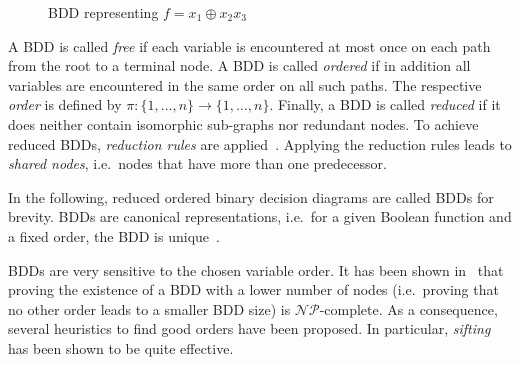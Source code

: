 \documentclass[10pt,letterpaper,twoside,openright]{book}
\begin{document}
\begin{figure}
\centering
{}
\caption{BDD representing $f=x_1 \oplus x_2x_3$}
\label{example:bdd}  
\end{figure}

A BDD is called \emph{free} if each variable is encountered at
most once on each path from the root to a terminal node. 
A BDD is called \emph{ordered} if in addition all
variables are encountered in the same order on all such paths. 
The respective \emph{order} is defined by
$\pi : \lbrace 1,\dots ,n\rbrace \rightarrow \lbrace 1,\dots ,n\rbrace $.
Finally, a BDD is called \emph{reduced} if it does neither contain isomorphic sub-graphs nor
redundant nodes. To achieve reduced BDDs, \emph{reduction rules} are applied~\cite{Bryant1986}.
Applying the reduction rules leads to \emph{shared nodes}, i.e.~nodes
that have more than one predecessor.

In the following, reduced ordered binary decision diagrams are called BDDs
for brevity. BDDs are canonical representations, i.e.~for a given Boolean function
and a fixed order, the BDD is unique~\cite{Bryant1986}. 


BDDs are very sensitive to the chosen variable order. It has been shown
in~\cite{BW:96} that proving the existence of a BDD with a lower number of nodes 
(i.e.~proving that no other order leads to a smaller BDD size)
is $\mathcal{NP}$-complete. As a consequence, several heuristics to find good orders have
been proposed. In particular, \emph{sifting}~\cite{Rudell1993} has been shown to be quite effective.
\end{document}

